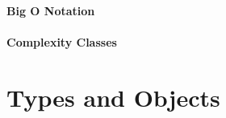 
\subsection{Big O Notation}


\subsection{Complexity Classes}



\newpage


\part*{Types and Objects}


